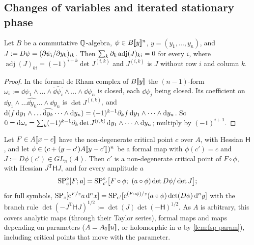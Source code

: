 
\subsection{Changes of variables and iterated stationary phase}
\label{sec:fsp-change}

\begin{lem}
\label{lem:fsp-piola}
Let $B$ be a commutative $\mathbb{Q}$-algebra, $\psi\in B[\![ y ]\!]^n$, $y=(y_1,\dots,y_n)$, and $J:=D\psi=(\partial\psi_i/\partial y_k)_{ik}$. Then $\sum_k\partial_k\operatorname{adj}(J)_{ki}=0$ for every $i$, where $\operatorname{adj}(J)_{ki}=(-1)^{i+k}\det J^{(i,k)}$ and $J^{(i,k)}$ is $J$ without row $i$ and column $k$.
\end{lem}

\begin{proof}
In the formal de Rham complex of $B[\![ y ]\!]$ the $(n-1)$-form $\omega_i:=\dd\psi_1\wedge\dots\wedge\widehat{\dd\psi_i}\wedge\dots\wedge\dd\psi_n$ is closed, each $\dd\psi_j$ being closed. Its coefficient on $\dd y_1\wedge\dots\widehat{\dd y_k}\dots\wedge\dd y_n$ is $\det J^{(i,k)}$, and $\mathrm{d}(f\,\mathrm{d} y_1\wedge\dots\widehat{\mathrm{d} y_k}\dots\wedge\mathrm{d} y_n)=(-1)^{k-1}\partial_kf\,\mathrm{d} y_1\wedge\dots\wedge\mathrm{d} y_n$. So $0=\mathrm{d}\omega_i=\sum_k(-1)^{k-1}\partial_k\det J^{(i,k)}\,\mathrm{d} y_1\wedge\dots\wedge\mathrm{d} y_n$; multiply by $(-1)^{i+1}$.
\end{proof}

\begin{lem}
\label{lem:fsp-cov}
Let $F\in A[\![ x-c ]\!]$ have the non-degenerate critical point $c$ over $A$, with Hessian $\mathsf H$, and let $\phi\in(c+(y-c')A[\![ y-c' ]\!])^n$ be a formal map with $\phi(c')=c$ and $J:=D\phi(c')\in GL_n(A)$. Then $c'$ is a non-degenerate critical point of $F\circ\phi$, with Hessian $J^{\mathrm T}\mathsf HJ$, and for every amplitude $a$
\[
\SPn_c[F;a]=\SPn_{c'}\bigl[F\circ\phi;\ (a\circ\phi)\det D\phi/\det J\bigr];
\]
for full symbols, $\mathrm{SP}_c[\mathrm{e}^{F/z}a\,\mathrm{d}^nx]=\mathrm{SP}_{c'}[\mathrm{e}^{(F\circ\phi)/z}(a\circ\phi)\det(D\phi)\,\mathrm{d}^ny]$ with the branch rule $\det(-J^{\mathrm T}\mathsf HJ)^{1/2}:=\det(J)\det(-\mathsf H)^{1/2}$. As $A$ is arbitrary, this covers analytic maps (through their Taylor series), formal maps and maps depending on parameters ($A=A_0[\![ u ]\!]$, or holomorphic in $u$ by \cref{lem:fsp-param}), including critical points that move with the parameter.
\end{lem}

